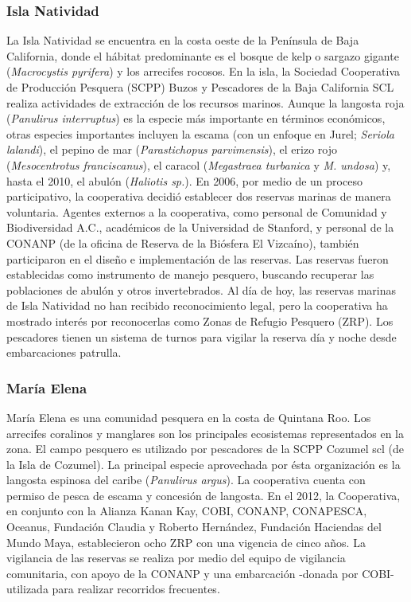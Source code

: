 \documentclass{frontiersSCNS}
\begin{document}
\subsubsection{Isla Natividad}\label{isla-natividad}

La Isla Natividad se encuentra en la costa oeste de la Península de Baja
California, donde el hábitat predominante es el bosque de kelp o sargazo
gigante (\emph{Macrocystis pyrifera}) y los arrecifes rocosos. En la
isla, la Sociedad Cooperativa de Producción Pesquera (SCPP) Buzos y
Pescadores de la Baja California SCL realiza actividades de extracción
de los recursos marinos. Aunque la langosta roja (\emph{Panulirus
interruptus}) es la especie más importante en términos económicos, otras
especies importantes incluyen la escama (con un enfoque en Jurel;
\emph{Seriola lalandi}), el pepino de mar (\emph{Parastichopus
parvimensis}), el erizo rojo (\emph{Mesocentrotus franciscanus}), el
caracol (\emph{Megastraea turbanica} y \emph{M. undosa}) y, hasta el
2010, el abulón (\emph{Haliotis sp.}). En 2006, por medio de un proceso
participativo, la cooperativa decidió establecer dos reservas marinas de
manera voluntaria. Agentes externos a la cooperativa, como personal de
Comunidad y Biodiversidad A.C., académicos de la Universidad de
Stanford, y personal de la CONANP (de la oficina de Reserva de la
Biósfera El Vizcaíno), también participaron en el diseño e
implementación de las reservas. Las reservas fueron establecidas como
instrumento de manejo pesquero, buscando recuperar las poblaciones de
abulón y otros invertebrados. Al día de hoy, las reservas marinas de
Isla Natividad no han recibido reconocimiento legal, pero la cooperativa
ha mostrado interés por reconocerlas como Zonas de Refugio Pesquero
(ZRP). Los pescadores tienen un sistema de turnos para vigilar la
reserva día y noche desde embarcaciones patrulla.

\subsubsection{María Elena}\label{maria-elena}

María Elena es una comunidad pesquera en la costa de Quintana Roo. Los
arrecifes coralinos y manglares son los principales ecosistemas
representados en la zona. El campo pesquero es utilizado por pescadores
de la SCPP Cozumel scl (de la Isla de Cozumel). La principal especie
aprovechada por ésta organización es la langosta espinosa del caribe
(\emph{Panulirus argus}). La cooperativa cuenta con permiso de pesca de
escama y concesión de langosta. En el 2012, la Cooperativa, en conjunto
con la Alianza Kanan Kay, COBI, CONANP, CONAPESCA, Oceanus, Fundación
Claudia y Roberto Hernández, Fundación Haciendas del Mundo Maya,
establecieron ocho ZRP con una vigencia de cinco años. La vigilancia de
las reservas se realiza por medio del equipo de vigilancia comunitaria,
con apoyo de la CONANP y una embarcación -donada por COBI- utilizada
para realizar recorridos frecuentes.
\end{document}
